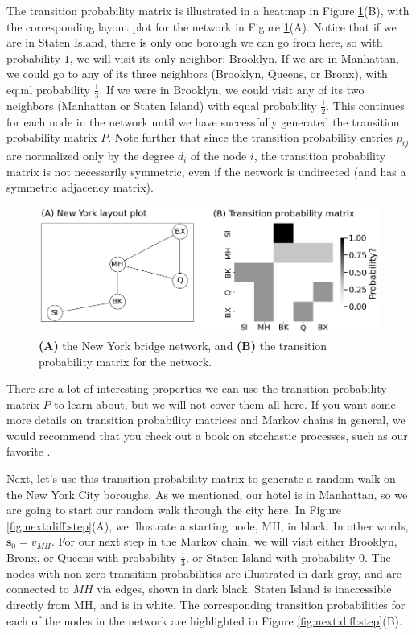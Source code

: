 The transition probability matrix is illustrated in a heatmap in Figure \ref{fig:next:diff:trans_mtx}(B), with the corresponding layout plot for the network in  Figure \ref{fig:next:diff:trans_mtx}(A). Notice that if we are in Staten Island, there is only one borough we can go from here, so with probability $1$, we will visit its only neighbor: Brooklyn. If we are in Manhattan, we could go to any of its three neighbors (Brooklyn, Queens, or Bronx), with equal probability $\frac{1}{3}$. If we were in Brooklyn, we could visit any of its two neighbors (Manhattan or Staten Island) with equal probability $\frac{1}{2}$. This continues for each node in the network until we have successfully generated the transition probability matrix $P$. Note further that since the transition probability entries $p_{ij}$ are normalized only by the degree $d_i$ of the node $i$, the transition probability matrix is not necessarily symmetric, even if the network is undirected (and has a symmetric adjacency matrix). 

\begin{figure}
    \centering
    \includegraphics[width=0.8\linewidth]{next/Images/first_ord.png}
    \caption[Transition probability matrix for the network]{\textbf{(A)} the New York bridge network, and \textbf{(B)} the transition probability matrix for the network.}
    \label{fig:next:diff:trans_mtx}
\end{figure}

There are a lot of interesting properties we can use the transition probability matrix $P$ to learn about, but we will not cover them all here. If you want some more details on transition probability matrices and Markov chains in general, we would recommend that you check out a book on stochastic processes, such as our favorite \cite{Isaacson1976Mar}.

Next, let's use this transition probability matrix to generate a random walk on the New York City boroughs. As we mentioned, our hotel is in Manhattan, so we are going to start our random walk through the city here. In Figure \ref{fig:next:diff:step}(A), we illustrate a starting node, MH, in black. In other words, $\mathbf s_0 = v_{MH}$. For our next step in the Markov chain, we will visit either Brooklyn, Bronx, or Queens with probability $\frac{1}{3}$, or Staten Island with probability $0$. The nodes with non-zero transition probabilities are illustrated in dark gray, and are connected to $MH$ via edges, shown in dark black. Staten Island is inaccessible directly from MH, and is in white. The corresponding transition probabilities for each of the nodes in the network are highlighted in Figure \ref{fig:next:diff:step}(B). 


